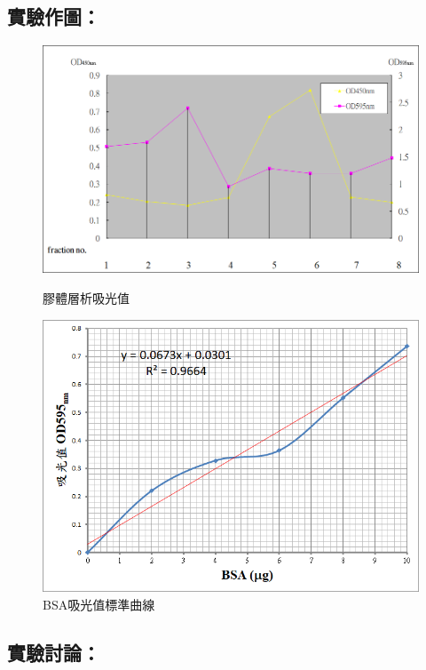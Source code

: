 \subsection*{實驗作圖：}

\begin{figure}[H]
\centering
\includegraphics[width=.8\textwidth]{paste_src/2023-10-18-22-15-33.png}
\caption{膠體層析吸光值}
\label{fig:gel_filtration}
\vspace{1em}
\includegraphics[width=.8\textwidth]{paste_src/2023-10-18-22-23-08.png}
\caption{BSA吸光值標準曲線}
\label{fig:stand_curve}
\end{figure}




\subsection*{實驗討論：}


 

